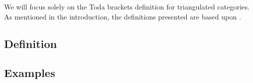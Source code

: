 We will focus solely on the Toda brackets definition for triangulated categories. As mentioned in the introduction, the definitions presented are based upon \cite[Definition 3.1]{Christensen-Frankland_2017}.

\subsection{Definition}


\subsection{Examples}
